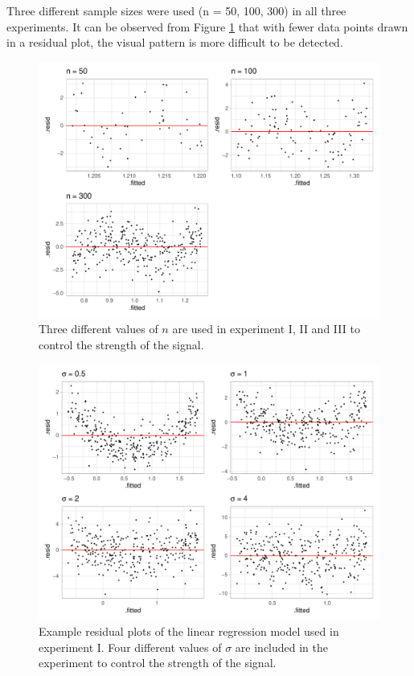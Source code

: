 \documentclass[]{interact}
\theoremstyle{plain}%
\theoremstyle{definition}
\theoremstyle{remark}
\begin{document}
Three different sample sizes were used (n = 50, 100, 300) in all three
experiments. It can be observed from Figure \ref{fig:different-n} that
with fewer data points drawn in a residual plot, the visual pattern is
more difficult to be detected.

\begin{figure}

{\centering \includegraphics[width=1\linewidth]{paper_comparison_files/figure-latex/different-n-1} 

}

\caption{Three different values of $n$ are used in experiment I, II and III to control the strength of the signal.}\label{fig:different-n}
\end{figure}

\begin{figure}

{\centering \includegraphics[width=1\linewidth]{paper_comparison_files/figure-latex/different-sigma-1} 

}

\caption{Example residual plots of the linear regression model used in experiment I. Four different values of $\sigma$ are included in the experiment to control the strength of the signal.}\label{fig:different-sigma}
\end{figure}
\end{document}
